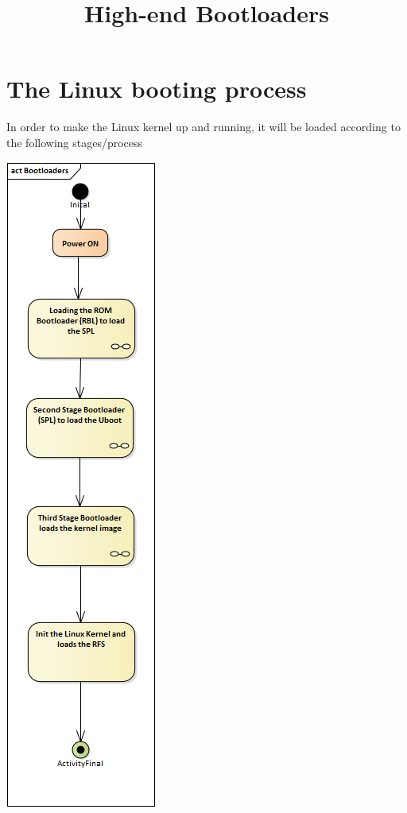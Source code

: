 \documentclass{article}
\title{\textbf{High-end Bootloaders}}
\author{}
\date{}
\begin{document}
\maketitle
\tableofcontents
\lstlistoflistings
\maketitle
\tableofcontents{}
\section{The Linux booting process}
In order to make the Linux kernel up and running, it will be loaded according to the following stages/process 

\begin{center}
\includegraphics[scale=0.50]{./resources/img/Bootloaders.png}
\end{center}
\end{document}
